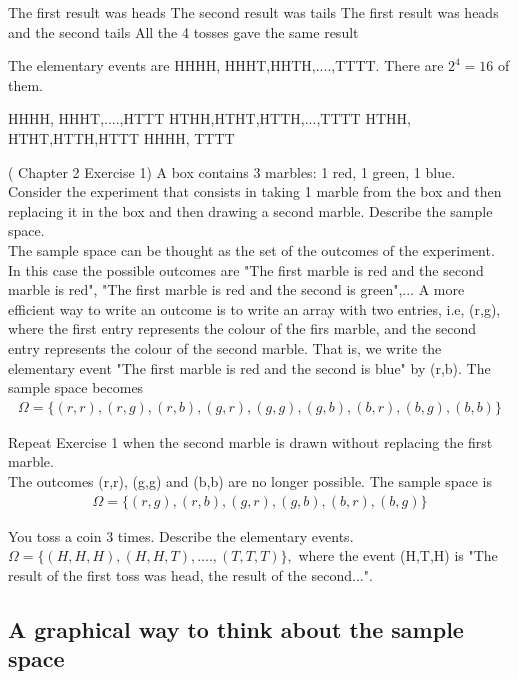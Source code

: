 \documentclass[12pt]{article}
\newcommand{\<}{{\langle \!\! \langle}}
\renewcommand{\>}{{\rangle \!\! \rangle}}
\newcommand{\bel}[2]{\begin{equation} \label{#1} \begin{split} #2
 					\end{split} \end{equation}}
\begin{document}
\begin{ExerciseList}
    
      \Question The first result was heads
      \Question The second result was tails
      \Question The first result was heads and the second tails 
      \Question All the 4 tosses gave the same result
    
	\Answer  The elementary events are HHHH, HHHT,HHTH,....,TTTT. There are $2^4=16$ of them.

	\Question HHHH, HHHT,....,HTTT 
	\Question HTHH,HTHT,HTTH,...,TTTT
	\Question HTHH, HTHT,HTTH,HTTT
	\Question  HHHH, TTTT

	\Exercise (\cite{Ross} Chapter 2 Exercise 1)
  A box contains 3 marbles: 1 red, 1 green, 1 blue. Consider the experiment that consists in taking 1 marble from the box and then replacing it in the box and then drawing a second marble. Describe the sample space.\\
 	
	\Answer The sample space can be thought as the set of the outcomes of the experiment. In this case the possible outcomes are "The first marble is red and the second marble is red", "The first marble is red and the second is green",... A more efficient way to write an outcome is to write an array with two entries, i.e, (r,g), where the first entry represents the colour of the firs marble, and the second entry represents the colour of the second marble. That is, we write the elementary event "The first marble is red and the second is blue" by (r,b). The sample space becomes 
  \bel{ex1}{\Omega=\{(r,r), (r,g),(r,b),(g,r), (g,g),(g,b),(b,r),(b,g),(b,b)\}}
 
 	\Exercise
 Repeat Exercise 1 when the second marble is drawn without replacing the first marble.\\
 	
	\Answer The outcomes (r,r), (g,g) and (b,b) are no longer possible. The sample space is 
 \bel{ex2}{\Omega=\{(r,g),(r,b),(g,r),(g,b),(b,r),(b,g)\}}
     
	\Exercise
You toss a coin 3 times. Describe the elementary events.\\
	
	\Answer $\Omega=\{(H,H,H), (H,H,T),....,(T,T,T)\},$ where the event (H,T,H) is "The result of the first toss was head, the result of the second...". 

\end{ExerciseList}

\subsection{ A graphical way to think about the sample space}
\end{document}
